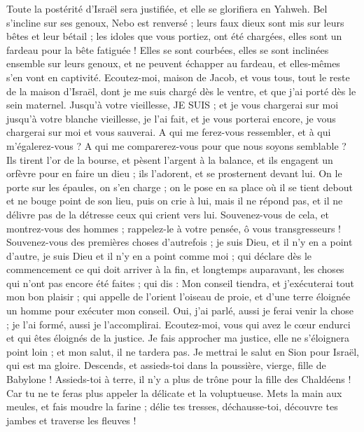 \begin{multicols}{2}
Toute la postérité d'Israël sera justifiée, et elle se glorifiera en Yahweh.
\VerseOne{}Bel s'incline sur ses genoux, Nebo est renversé ; leurs faux dieux sont mis sur leurs bêtes et leur bétail ; les idoles que vous portiez, ont été chargées, elles sont un fardeau pour la bête fatiguée !
Elles se sont courbées, elles se sont inclinées ensemble sur leurs genoux, et ne peuvent échapper au fardeau, et elles-mêmes s'en vont en captivité.
Ecoutez-moi, maison de Jacob, et vous tous, tout le reste de la maison d'Israël, dont je me suis chargé dès le ventre, et que j'ai porté dès le sein maternel.
Jusqu'à votre vieillesse, JE SUIS ; et je vous chargerai sur moi jusqu'à votre blanche vieillesse, je l'ai fait, et je vous porterai encore, je vous chargerai sur moi et vous sauverai.
A qui me ferez-vous ressembler, et à qui m'égalerez-vous ? A qui me comparerez-vous pour que nous soyons semblable ? 
Ils tirent l'or de la bourse, et pèsent l'argent à la balance, et ils engagent un orfèvre pour en faire un dieu ; ils l'adorent, et se prosternent devant lui.
On le porte sur les épaules, on s'en charge ; on le pose en sa place où il se tient debout et ne bouge point de son lieu, puis on crie à lui, mais il ne répond pas, et il ne délivre pas de la détresse ceux qui crient vers lui.
Souvenez-vous de cela, et montrez-vous des hommes ; rappelez-le à votre pensée, ô vous transgresseurs !
Souvenez-vous des premières choses d'autrefois ; je suis Dieu, et il n'y en a point d'autre, je suis Dieu et il n'y en a point comme moi ;
qui déclare dès le commencement ce qui doit arriver à la fin, et longtemps auparavant, les choses qui n'ont pas encore été faites ; qui dis : Mon conseil tiendra, et j'exécuterai tout mon bon plaisir ;
qui appelle de l'orient l'oiseau de proie, et d'une terre éloignée un homme pour exécuter mon conseil. Oui, j'ai parlé, aussi je ferai venir la chose ; je l'ai formé, aussi je l'accomplirai. 
Ecoutez-moi, vous qui avez le cœur endurci et qui êtes éloignés de la justice.
Je fais approcher ma justice, elle ne s'éloignera point loin ; et mon salut, il ne tardera pas. Je mettrai le salut en Sion pour Israël, qui est ma gloire.
\VerseOne{}Descends, et assieds-toi dans la poussière, vierge, fille de Babylone ! Assieds-toi à terre, il n'y a plus de trône pour la fille des Chaldéens ! Car tu ne te feras plus appeler la délicate et la voluptueuse.
Mets la main aux meules, et fais moudre la farine ; délie tes tresses, déchausse-toi, découvre tes jambes et traverse les fleuves !

\end{multicols}
